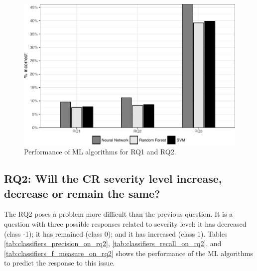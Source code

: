 \begin{figure}[!ht]
  \centering
  \includegraphics[scale=1]{figures/classifiers_performance_on_q1q2q3.pdf}
  \caption{Performance of ML algorithms for RQ1 and RQ2.}
  \label{fig:classifiers_performance_on_q1q2q3}
\end{figure}

\subsection{RQ2: Will the CR severity level increase, decrease or remain the same?}\label{subsec:rq2}

The RQ2 poses a problem more difficult than the previous question. It is a question with three possible responses related to severity level: it has decreased (class -1); it has remained (class 0); and it has increased (class 1). Tables \ref{tab:classifiers_precision_on_rq2}, \ref{tab:classifiers_recall_on_rq2}, and \ref{tab:classifiers_f_measure_on_rq2} shows the performance of the ML algorithms to predict the response to this issue. 

